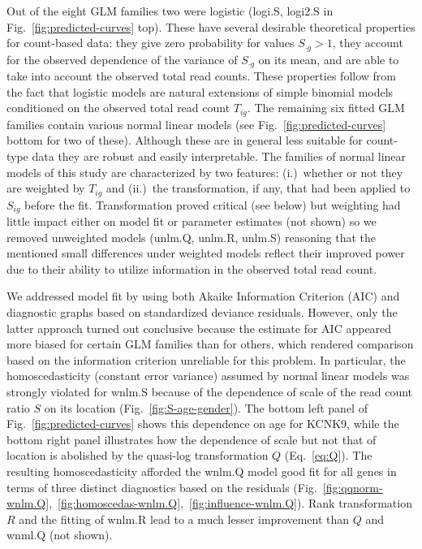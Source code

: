 \documentclass[letterpaper]{article}
\begin{document}
Out of the eight GLM families two were logistic (logi.S, logi2.S in
Fig.~\ref{fig:predicted-curves} top).  These have several desirable
theoretical properties for count-based data: they give zero probability for values
\(S_{\cdot g}>1\), they account for the observed dependence of the variance of
\(S_{\cdot g}\) on its mean, and are able to take into account the observed total
read counts.  These properties follow from the fact that logistic models are
natural extensions of simple binomial models conditioned on the observed total
read count \(T_{ig}\).  The remaining six fitted GLM families contain various
normal linear models (see Fig.~\ref{fig:predicted-curves} bottom for two of
these).  Although these are in general less suitable for count-type data they
are robust and easily interpretable. The families of normal linear models of
this study are characterized by two features: (i.)~whether or not they are
weighted by \(T_{ig}\) and (ii.)~the transformation, if any, that had been
applied to \(S_{ig}\) before the fit.  Transformation proved critical (see
below) but weighting had little impact either on model fit or parameter
estimates (not shown) so we removed unweighted models (unlm.Q, unlm.R, unlm.S)
reasoning that the mentioned small differences under weighted models reflect their
improved power due to their ability to utilize information in the observed
total read count.

We addressed model fit by using both Akaike Information Criterion (AIC) and
diagnostic graphs based on standardized deviance residuals.  However, only the
latter approach turned out conclusive because the estimate for AIC appeared
more biased for certain GLM families than for others, which rendered comparison
based on the information criterion unreliable for this problem.  In
particular, the homoscedasticity (constant error variance) assumed by normal
linear models
was strongly violated for wnlm.S because of the dependence of scale
of the read count ratio \(S\) on its location
(Fig.~\ref{fig:S-age-gender}).  The bottom left panel of Fig.~\ref{fig:predicted-curves}
shows this dependence on age for KCNK9, while the bottom right panel
illustrates how the dependence of scale but not that of location is abolished
by the quasi-log transformation \(Q\) (Eq.~\ref{eq:Q}).  The resulting
homoscedasticity afforded the wnlm.Q model good fit for all genes in terms of
three distinct diagnostics based on the residuals
(Fig.~\ref{fig:qqnorm-wnlm.Q},~\ref{fig:homoscedas-wnlm.Q},~\ref{fig:influence-wnlm.Q}).
Rank transformation \(R\) and the fitting of wnlm.R lead to a much lesser
improvement than \(Q\) and wnml.Q (not shown).
\end{document}
